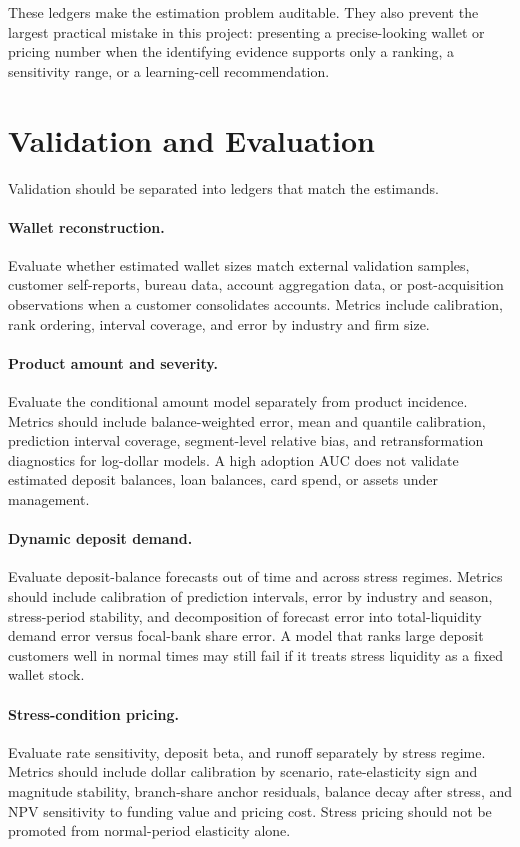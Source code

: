 \documentclass[11pt]{article}
\begin{document}
These ledgers make the estimation problem auditable. They also prevent the
largest practical mistake in this project: presenting a precise-looking wallet
or pricing number when the identifying evidence supports only a ranking, a
sensitivity range, or a learning-cell recommendation.

\section{Validation and Evaluation}

Validation should be separated into ledgers that match the estimands.

\paragraph{Wallet reconstruction.}
Evaluate whether estimated wallet sizes match external validation samples,
customer self-reports, bureau data, account aggregation data, or post-acquisition
observations when a customer consolidates accounts. Metrics include calibration,
rank ordering, interval coverage, and error by industry and firm size.

\paragraph{Product amount and severity.}
Evaluate the conditional amount model separately from product incidence. Metrics
should include balance-weighted error, mean and quantile calibration, prediction
interval coverage, segment-level relative bias, and retransformation diagnostics
for log-dollar models. A high adoption AUC does not validate estimated deposit
balances, loan balances, card spend, or assets under management.

\paragraph{Dynamic deposit demand.}
Evaluate deposit-balance forecasts out of time and across stress regimes.
Metrics should include calibration of prediction intervals, error by industry
and season, stress-period stability, and decomposition of forecast error into
total-liquidity demand error versus focal-bank share error. A model that ranks
large deposit customers well in normal times may still fail if it treats stress
liquidity as a fixed wallet stock.

\paragraph{Stress-condition pricing.}
Evaluate rate sensitivity, deposit beta, and runoff separately by stress regime.
Metrics should include dollar calibration by scenario, rate-elasticity sign and
magnitude stability, branch-share anchor residuals, balance decay after stress,
and NPV sensitivity to funding value and pricing cost. Stress pricing should not
be promoted from normal-period elasticity alone.
\end{document}
